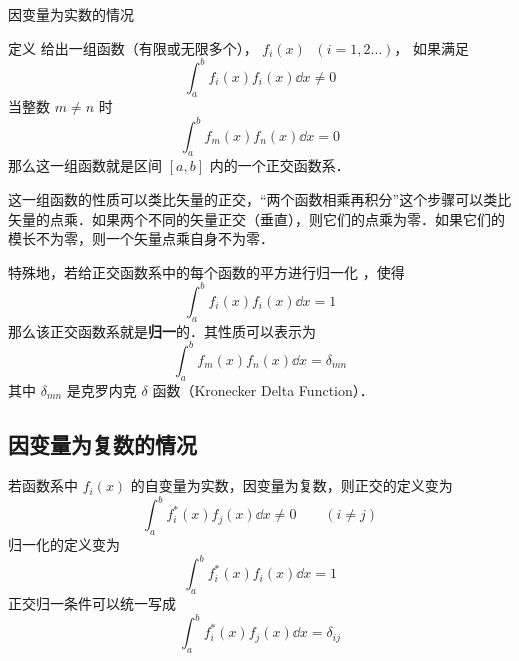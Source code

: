 
因变量为实数的情况

定义
给出一组函数（有限或无限多个）， ${f_i}(x)\;$ $( {i = 1,2\dots} )$，  如果满足
\begin{equation}
\int_a^b f_i(x) f_i(x) \dd{x} \ne 0
\end{equation} 
当整数 $m \ne n$ 时
\begin{equation}
\int_a^b f_m(x) f_n(x) \dd{x} = 0
\end{equation} 
那么这一组函数就是区间 $[a,b]$ 内的一个正交函数系．

这一组函数的性质可以类比矢量的正交，“两个函数相乘再积分”这个步骤可以类比矢量的点乘．如果两个不同的矢量正交（垂直），则它们的点乘为零．如果它们的模长不为零，则一个矢量点乘自身不为零．

特殊地，若给正交函数系中的每个函数的平方进行归一化%
，使得
\begin{equation}
\int_a^b f_i(x) f_i(x) \dd{x} = 1
\end{equation} 
那么该正交函数系就是\textbf{归一}的．其性质可以表示为
 \begin{equation}
\int_a^b f_m(x) f_n(x) \dd{x} = \delta _{mn}
\end{equation} 
其中 $\delta _{mn}$ 是克罗内克 $\delta$ 函数（Kronecker Delta Function）．


\subsection{因变量为复数的情况}

若函数系中 ${f_i}(x)$ 的自变量为实数，因变量为复数，则正交的定义变为
 \begin{equation}
\int_a^b f_i^*(x) f_j(x) \dd{x} \ne 0 \qquad ( i \ne j )
\end{equation}    
归一化的定义变为
 \begin{equation}
\int_a^b f_i^*(x) f_i(x) \dd{x} = 1
\end{equation} 
正交归一条件可以统一写成
 \begin{equation}
\int_a^b f_i^*(x) f_j(x) \dd{x} = \delta _{ij}
\end{equation}